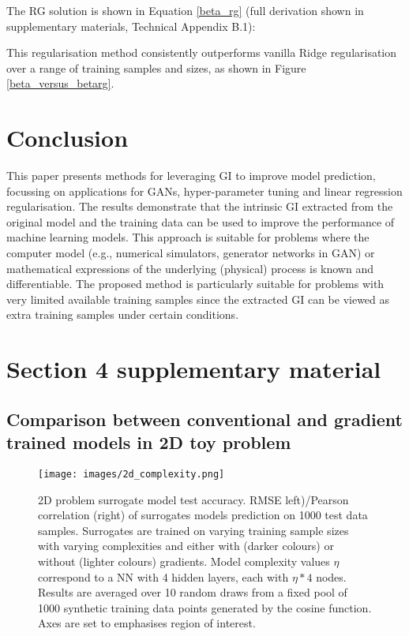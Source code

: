 \documentclass{article}
\begin{document}
The RG solution is shown in Equation \ref{beta_rg} (full derivation shown in supplementary materials, Technical Appendix B.1):


This regularisation method consistently outperforms vanilla Ridge regularisation over a range of training samples and sizes, as shown in Figure \ref{beta_versus_betarg}.




\section{Conclusion}
\label{Con}
This paper presents methods for leveraging GI to improve model prediction, focussing on applications for GANs, hyper-parameter tuning and linear regression regularisation. The results demonstrate that the intrinsic GI extracted from the original model and the training data can be used to improve the performance of machine learning models. This approach is suitable for problems where the computer model (e.g., numerical simulators, generator networks in GAN) or mathematical expressions of the underlying (physical) process is known and differentiable. The proposed method is particularly suitable for problems with very limited available training samples since the extracted GI can be viewed as extra training samples under certain conditions.  




\clearpage
\appendix

\section{Section 4 supplementary material}

\subsection{Comparison between conventional and gradient trained models in 2D toy problem}

\begin{figure}[!ht]
	\centering
	\texttt{[image: images/2d\_complexity.png]}
	\caption{2D problem surrogate model test accuracy. RMSE left)/Pearson correlation (right) of surrogates models prediction on 1000 test data samples. Surrogates are trained on varying training sample sizes with varying complexities and either with (darker colours) or without (lighter colours) gradients. Model complexity values $\eta$ correspond to a NN with 4 hidden layers, each with $\eta * 4$ nodes. Results are averaged over 10 random draws from a fixed pool of 1000 synthetic training data points generated by the cosine function. Axes are set to emphasises region of interest.}
	\label{2d_complexity}
\end{figure}
\end{document}
